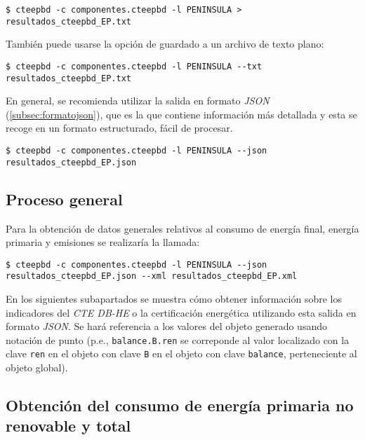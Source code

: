 \documentclass[10pt,notitlepage,oneside,a4paper]{article}
\begin{document}
\begin{Verbatim}[fontsize=\small]
    $ cteepbd -c componentes.cteepbd -l PENINSULA > resultados_cteepbd_EP.txt
\end{Verbatim}

También puede usarse la opción de guardado a un archivo de texto plano:

\begin{Verbatim}[fontsize=\small]
    $ cteepbd -c componentes.cteepbd -l PENINSULA --txt resultados_cteepbd_EP.txt
\end{Verbatim}

En general, se recomienda utilizar la salida en formato \textit{JSON} (\autoref{subsec:formatojson}), que es la que contiene información más detallada y esta se recoge en un formato estructurado, fácil de procesar.

\begin{Verbatim}[fontsize=\small]
    $ cteepbd -c componentes.cteepbd -l PENINSULA --json resultados_cteepbd_EP.json
\end{Verbatim}

\subsection{Proceso general}

Para la obtención de datos generales relativos al consumo de energía final, energía primaria y emisiones se realizaría la llamada:

\begin{Verbatim}[fontsize=\small]
    $ cteepbd -c componentes.cteepbd -l PENINSULA --json resultados_cteepbd_EP.json --xml resultados_cteepbd_EP.xml
\end{Verbatim}

En los siguientes subapartados se muestra cómo obtener información sobre los indicadores del \textit{CTE DB-HE} o la certificación energética utilizando esta salida en formato \textit{JSON}. Se hará referencia a los valores del objeto generado usando notación de punto (p.e., \texttt{balance.B.ren} se correponde al valor localizado con la clave \texttt{ren} en el objeto con clave \texttt{B} en el objeto con clave \texttt{balance}, perteneciente al objeto global).

\subsection{Obtención del consumo de energía primaria no renovable y total}
\end{document}
